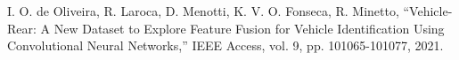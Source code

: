 \documentclass[conference]{IEEEtran}
\begin{document}





\begin{thebibliography}{00}
 I. O. de Oliveira, R. Laroca, D. Menotti, K. V. O. Fonseca, R. Minetto, “Vehicle-Rear: A New Dataset to Explore Feature Fusion for Vehicle Identification Using Convolutional Neural Networks,” IEEE Access, vol. 9, pp. 101065-101077, 2021.
\end{thebibliography}
\end{document}
